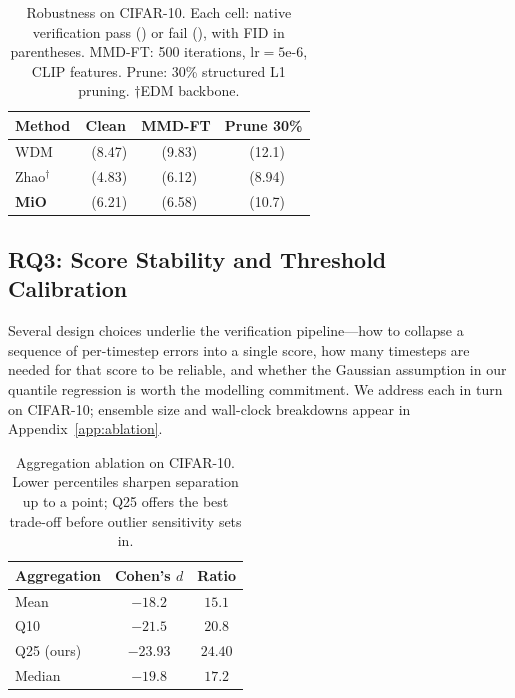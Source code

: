 \documentclass[sigconf, review, anonymous]{acmart}
\newcommand{\cmark}{\ding{51}}
\newcommand{\xmark}{\ding{55}}
\begin{document}
\begin{table}[t]
\caption{Robustness on CIFAR-10.
Each cell: native verification pass (\cmark) or fail (\xmark),
with FID in parentheses.
MMD-FT: 500 iterations, lr${}=5\text{e-}6$, CLIP features.
Prune: 30\% structured L1 pruning.
$\dagger$EDM backbone.}
\label{tab:robustness}
\centering
\small
\begin{tabular}{@{}lccc@{}}
\toprule
Method & Clean & MMD-FT & Prune 30\% \\
\midrule
WDM            & \cmark~(8.47)  & \xmark~(9.83)  & \cmark~(12.1) \\
Zhao$^\dagger$ & \cmark~(4.83)  & \xmark~(6.12)  & \xmark~(8.94) \\
\textbf{MiO}   & \cmark~(6.21)  & \cmark~(6.58)  & \cmark~(10.7) \\
\bottomrule
\end{tabular}
\end{table}

\subsection{RQ3: Score Stability and Threshold Calibration}
\label{sec:ablation}

Several design choices underlie the verification pipeline---how to
collapse a sequence of per-timestep errors into a single score, how
many timesteps are needed for that score to be reliable, and whether
the Gaussian assumption in our quantile regression is worth the
modelling commitment.  We address each in turn on CIFAR-10; ensemble
size and wall-clock breakdowns appear in
Appendix~\ref{app:ablation}.

\begin{table}[t]
\caption{Aggregation ablation on CIFAR-10.  Lower percentiles
sharpen separation up to a point; Q25 offers the best trade-off
before outlier sensitivity sets in.}
\label{tab:aggregation}
\begin{center}
\begin{small}
\begin{tabular}{lcc}
\toprule
Aggregation & Cohen's $d$ & Ratio \\
\midrule
Mean & $-18.2$ & $15.1$ \\
Q10 & $-21.5$ & $20.8$ \\
Q25 (ours) & $\mathbf{-23.93}$ & $\mathbf{24.40}$ \\
Median & $-19.8$ & $17.2$ \\
\bottomrule
\end{tabular}
\end{small}
\end{center}
\end{table}
\end{document}
